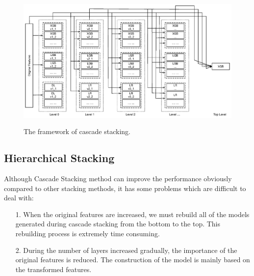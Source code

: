 \documentclass[12pt]{article}
\begin{document}
\begin{figure}[ht]
  \centering
  \includegraphics[width=1.0\textwidth]{../img/cascade-stacking}\\
  \caption{The framework of cascade stacking.}
  \label{fig:cascade-stacking}
\end{figure}

\subsection{Hierarchical Stacking}

Although Cascade Stacking method can improve the performance obviously compared to other stacking methods, it has some problems which are difficult to deal with:

\begin{itemize}
\item[1.] When the original features are increased, we must rebuild all of the models generated during cascade stacking from the bottom to the top. This rebuilding process is extremely time consuming.
\item[2.] During the number of layers increased gradually, the importance of the original features is reduced. The construction of the model is mainly based on the transformed features. 
\end{itemize}
\end{document}
